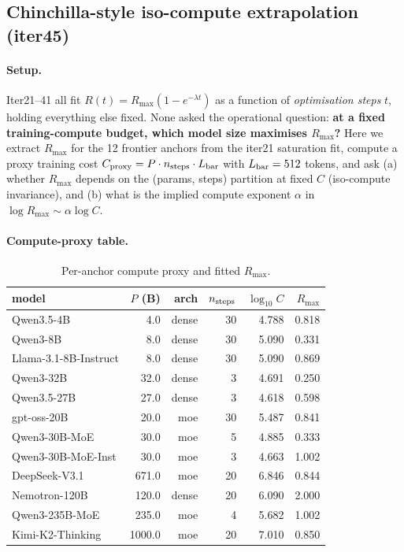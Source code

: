 \documentclass{article}
\begin{document}
 \subsection{Chinchilla-style iso-compute extrapolation (iter45)}
\label{sec:scaling-law-iter45}
\paragraph{Setup.} Iter21--41 all fit $R(t)=R_{\max}(1-e^{-\lambda t})$ as a function of \emph{optimisation steps} $t$, holding everything else fixed. None asked the operational question: \textbf{at a fixed training-compute budget, which model size maximises $R_{\max}$?} Here we extract $R_{\max}$ for the 12 frontier anchors from the iter21 saturation fit, compute a proxy training cost $C_\mathrm{proxy} = P \cdot n_{\rm steps} \cdot L_{\rm bar}$ with $L_{\rm bar}=512$ tokens, and ask (a) whether $R_{\max}$ depends on the (params, steps) partition at fixed $C$ (iso-compute invariance), and (b) what is the implied compute exponent $\alpha$ in $\log R_{\max}\sim\alpha\log C$.
\paragraph{Compute-proxy table.}
\begin{table}[ht]
\centering\small
\begin{tabular}{lrrrrr}
\toprule
model & $P$ (B) & arch & $n_{\rm steps}$ & $\log_{10}C$ & $R_{\max}$ \\
\midrule
 Qwen3.5-4B & 4.0 & dense & 30 & 4.788 & 0.818 \\
 Qwen3-8B & 8.0 & dense & 30 & 5.090 & 0.331 \\
 Llama-3.1-8B-Instruct & 8.0 & dense & 30 & 5.090 & 0.869 \\
 Qwen3-32B & 32.0 & dense & 3 & 4.691 & 0.250 \\
 Qwen3.5-27B & 27.0 & dense & 3 & 4.618 & 0.598 \\
 gpt-oss-20B & 20.0 & moe & 30 & 5.487 & 0.841 \\
 Qwen3-30B-MoE & 30.0 & moe & 5 & 4.885 & 0.333 \\
 Qwen3-30B-MoE-Inst & 30.0 & moe & 3 & 4.663 & 1.002 \\
 DeepSeek-V3.1 & 671.0 & moe & 20 & 6.846 & 0.844 \\
 Nemotron-120B & 120.0 & dense & 20 & 6.090 & 2.000 \\
 Qwen3-235B-MoE & 235.0 & moe & 4 & 5.682 & 1.002 \\
 Kimi-K2-Thinking & 1000.0 & moe & 20 & 7.010 & 0.850 \\
\bottomrule
\end{tabular}
\caption{Per-anchor compute proxy and fitted $R_{\max}$.}
\end{table}
\end{document}
